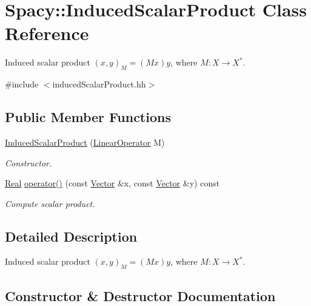\hypertarget{classSpacy_1_1InducedScalarProduct}{}\section{Spacy\+:\+:Induced\+Scalar\+Product Class Reference}
\label{classSpacy_1_1InducedScalarProduct}


Induced scalar product $(x,y)_M = (Mx)y$, where $M:X\rightarrow X^*$.  




{\ttfamily \#include $<$induced\+Scalar\+Product.\+hh$>$}

\subsection*{Public Member Functions}
\begin{DoxyCompactItemize}
\item 
\hyperlink{classSpacy_1_1InducedScalarProduct_a8cf4d6c0823b6c9d59be783d3627130e}{Induced\+Scalar\+Product} (\hyperlink{classSpacy_1_1LinearOperator}{Linear\+Operator} M)
\begin{DoxyCompactList}\small\item\em Constructor. \end{DoxyCompactList}\item 
\hyperlink{classSpacy_1_1Real}{Real} \hyperlink{classSpacy_1_1InducedScalarProduct_ab16021f05080b32714276f9b125df8af}{operator()} (const \hyperlink{classSpacy_1_1Vector}{Vector} \&x, const \hyperlink{classSpacy_1_1Vector}{Vector} \&y) const 
\begin{DoxyCompactList}\small\item\em Compute scalar product. \end{DoxyCompactList}\end{DoxyCompactItemize}


\subsection{Detailed Description}
Induced scalar product $(x,y)_M = (Mx)y$, where $M:X\rightarrow X^*$. 

\subsection{Constructor \& Destructor Documentation}
\hypertarget{classSpacy_1_1InducedScalarProduct_a8cf4d6c0823b6c9d59be783d3627130e}{}
